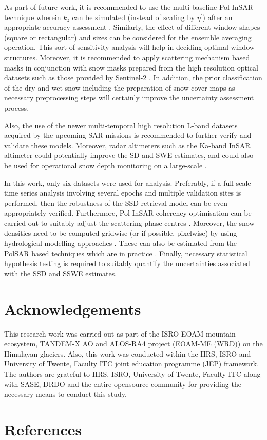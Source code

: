 \documentclass[12pt]{elsarticle}
\numberwithin{equation}{section}
\numberwithin{figure}{section}
\numberwithin{table}{section}
\begin{document}
As part of future work, it is recommended to use the multi-baseline Pol-InSAR technique \citep{Cloude2010} wherein $k_z$ can be simulated (instead of scaling by $\eta^\prime$) after an appropriate accuracy assessment \citep{Kumar2017}. Similarly, the effect of different window shapes (square or rectangular) and sizes can be considered for the ensemble averaging operation. This sort of sensitivity analysis will help in deciding optimal window structures. Moreover, it is recommended to apply scattering mechanism based masks in conjunction with snow masks prepared from the high resolution optical datasets such as those provided by Sentinel-2 \citep{Zhu2015}. In addition, the prior classification of the dry and wet snow including the preparation of snow cover maps \citep{Leinss2018, Thakur2012, Zhu2015} as necessary preprocessing steps will certainly improve the uncertainty assessment process.

Also, the use of the newer multi-temporal high resolution L-band datasets acquired by the upcoming SAR missions \citep{Tridon2018, Rosen2017} is recommended to further verify and validate these models. Moreover, radar altimeters such as the Ka-band InSAR altimeter could potentially improve the SD and SWE estimates, and could also be used for operational snow depth monitoring on a large-scale \citep{Hensley2016, Kim2018, Moller2011, Speziali2018}.

In this work, only six datasets were used for analysis. Preferably, if a full scale time series analysis involving several epochs and multiple validation sites is performed, then the robustness of the SSD retrieval model can be even appropriately verified. Furthermore, Pol-InSAR coherency optimisation can be carried out to suitably adjust the scattering phase centres \citep{Cloude2005, Cloude2010}. Moreover, the snow densities need to be computed gridwise (or if possible, pixelwise) by using hydrological modelling approaches \citep{Bartelt2002, Liang1994}. These can also be estimated from the PolSAR based techniques which are in practice \citep{Singh2017, Thakur2012}. Finally, necessary statistical hypothesis testing is required to suitably quantify the uncertainties associated with the SSD and SSWE estimates.

\section*{Acknowledgements}
This research work was carried out as part of the ISRO EOAM mountain ecosystem, TANDEM-X AO and ALOS-RA4 project (EOAM-ME (WRD)) on the Himalayan glaciers. Also, this work was conducted within the IIRS, ISRO and University of Twente, Faculty ITC joint education programme (JEP) framework. The authors are grateful to IIRS, ISRO, University of Twente, Faculty ITC along with SASE, DRDO and the entire opensource community for providing the necessary means to conduct this study.  

\section*{References}
\footnotesize{}
\end{document}
